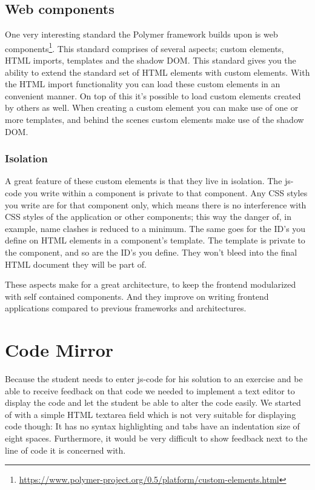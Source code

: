 \subsection{Web components}
One very interesting standard the Polymer framework builds upon is
web components\footnote{\url{https://www.polymer-project.org/0.5/platform/custom-elements.html}}.
This standard comprises of several aspects;
custom elements, HTML imports, templates and the shadow DOM.
This standard gives you the ability
to extend the standard set of HTML elements with custom elements.
With the HTML import functionality you can load these custom elements
in an convenient manner.
On top of this it's possible to load custom elements created by others as well.
When creating a custom element you can make use of one or more templates,
and behind the scenes custom elements make use of the shadow DOM.

\subsubsection{Isolation}
A great feature of these custom elements is that they live in isolation.
The \gls{js-code} you write within a component is private to that component.
Any CSS styles you write are for that component only,
which means there is no interference with CSS styles of the application
or other components; this way the danger of, in example, name clashes is 
reduced to a minimum.
The same goes for the ID's you define
on HTML elements in a component's template.
The template is private to the component, and so are the ID's you define.
They won't bleed into the final HTML document they will be part of.

These aspects make for a great architecture,
to keep the frontend modularized with self contained components.
And they improve on writing frontend applications
compared to previous frameworks and architectures.

\section{Code Mirror}
Because the \gls{student} needs to enter \gls{js-code}
for his solution to an exercise
and be able to receive feedback on that code
we needed to implement a text editor to display the code
and let the \gls{student} be able to alter the code easily.
We started of with a simple HTML textarea field
which is not very suitable for displaying code though:
It has no syntax highlighting
and tabs have an indentation size of eight spaces.
Furthermore, it would be very difficult to show feedback
next to the line of code it is concerned with.

